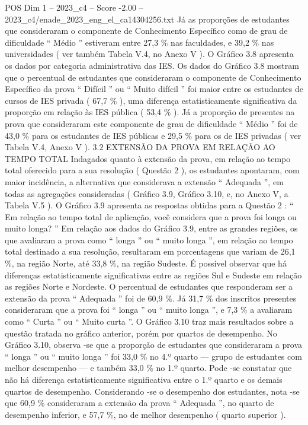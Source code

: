 \begin{textsample}{POS Dim 1 – 2023\_c4 – Score -2.00 – 2023\_c4/enade\_2023\_eng\_el\_ca14304256.txt}
Já as proporções de estudantes que consideraram o componente de Conhecimento Específico como de grau de dificuldade “ Médio ” estiveram entre 27,3 \% nas faculdades, e 39,2 \% nas universidades ( ver também Tabela V.4, no Anexo V ).
O Gráfico 3.8 apresenta os dados por categoria administrativa das IES.
Os dados do Gráfico 3.8 mostram que o percentual de estudantes que consideraram o componente de Conhecimento Específico da prova “ Difícil ” ou “ Muito difícil ” foi maior entre os estudantes de cursos de IES privada ( 67,7 \% ), uma diferença estatisticamente significativa da proporção em relação às IES pública ( 53,4 \% ).
Já a proporção de presentes na prova que consideraram este componente de grau de dificuldade “ Médio ” foi de 43,0 \% para os estudantes de IES públicas e 29,5 \% para os de IES privadas ( ver Tabela V.4, Anexo V ). 3.2 EXTENSÃO DA PROVA EM RELAÇÃO AO TEMPO TOTAL Indagados quanto à extensão da prova, em relação ao tempo total oferecido para a sua resolução ( Questão 2 ), os estudantes apontaram, com maior incidência, a alternativa que considerava a extensão “ Adequada ”, em todas as agregações consideradas ( Gráfico 3.9, Gráfico 3.10, e, no Anexo V, a Tabela V.5 ).
O Gráfico 3.9 apresenta as respostas obtidas para a Questão 2 : “ Em relação ao tempo total de aplicação, você considera que a prova foi longa ou muito longa? ” Em relação aos dados do Gráfico 3.9, entre as grandes regiões, os que avaliaram a prova como “ longa ” ou “ muito longa ”, em relação ao tempo total destinado a sua resolução, resultaram em porcentagens que variam de 26,1 \%, na região Norte, até 33,8 \%, na região Sudeste.
É possível observar que há diferenças estatisticamente significativas entre as regiões Sul e Sudeste em relação as regiões Norte e Nordeste.
O percentual de estudantes que responderam ser a extensão da prova “ Adequada ” foi de 60,9 \%.
Já 31,7 \% dos inscritos presentes consideraram que a prova foi “ longa ” ou “ muito longa ”, e 7,3 \% a avaliaram como “ Curta ” ou “ Muito curta ”.
O Gráfico 3.10 traz mais resultados sobre a questão tratada no gráfico anterior, porém por quartos de desempenho.
No Gráfico 3.10, observa -se que a proporção de estudantes que consideraram a prova “ longa ” ou “ muito longa ” foi 33,0 \% no 4.º quarto — grupo de estudantes com melhor desempenho — e também 33,0 \% no 1.º quarto.
Pode -se constatar que não há diferença estatisticamente significativa entre o 1.º quarto e os demais quartos de desempenho.
Considerando -se o desempenho dos estudantes, nota -se que 60,9 \% consideraram a extensão da prova “ Adequada ”, no quarto de desempenho inferior, e 57,7 \%, no de melhor desempenho ( quarto superior ).

\end{textsample}
